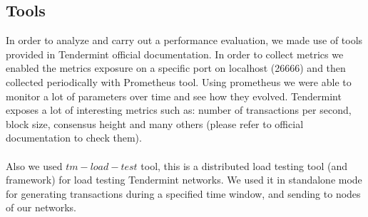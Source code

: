 \documentclass{article}
\begin{document}
	\subsection{Tools}
	In order to analyze and carry out a performance evaluation, we made use of tools provided in Tendermint official documentation. In order to collect metrics we enabled the metrics exposure on a specific port on localhost (26666) and then collected periodically with Prometheus tool. Using prometheus we were able to monitor a lot of parameters over time and see how they evolved. Tendermint exposes a lot of interesting metrics such as: number of transactions per second, block size, consensus height and many others (please refer to official documentation to check them). \\ \\
	Also we used $tm-load-test$ tool, this is a distributed load testing tool (and framework) for load testing Tendermint networks. We used it in standalone mode for generating transactions during a specified time window, and sending to nodes of our networks.
\end{document}
